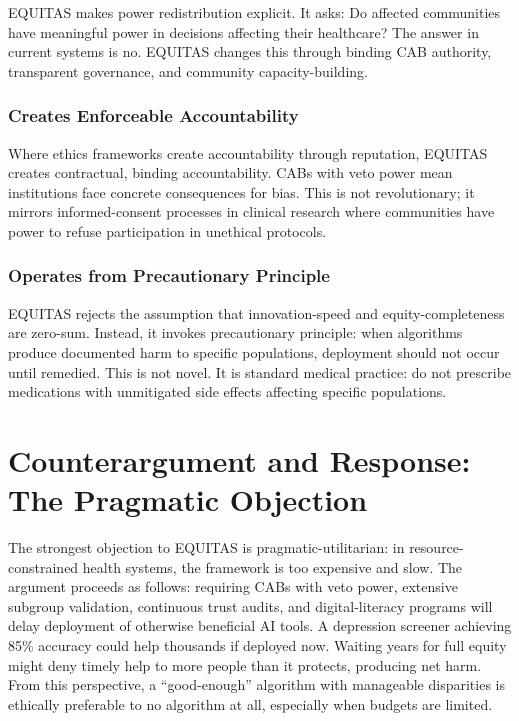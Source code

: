 \documentclass[12pt,a4paper]{article}
\begin{document}
EQUITAS makes power redistribution explicit. It asks: Do affected communities have meaningful power in decisions affecting their healthcare? The answer in current systems is no. EQUITAS changes this through binding CAB authority, transparent governance, and community capacity-building.

\subsubsection{Creates Enforceable Accountability}

Where ethics frameworks create accountability through reputation, EQUITAS creates contractual, binding accountability. CABs with veto power mean institutions face concrete consequences for bias. This is not revolutionary; it mirrors informed-consent processes in clinical research where communities have power to refuse participation in unethical protocols.

\subsubsection{Operates from Precautionary Principle}

EQUITAS rejects the assumption that innovation-speed and equity-completeness are zero-sum. Instead, it invokes precautionary principle: when algorithms produce documented harm to specific populations, deployment should not occur until remedied. This is not novel. It is standard medical practice: do not prescribe medications with unmitigated side effects affecting specific populations.

\section{Counterargument and Response: The Pragmatic Objection}

The strongest objection to EQUITAS is pragmatic-utilitarian: in resource-constrained health systems, the framework is too expensive and slow. The argument proceeds as follows: requiring CABs with veto power, extensive subgroup validation, continuous trust audits, and digital-literacy programs will delay deployment of otherwise beneficial AI tools. A depression screener achieving 85\% accuracy could help thousands if deployed now. Waiting years for full equity might deny timely help to more people than it protects, producing net harm. From this perspective, a ``good-enough'' algorithm with manageable disparities is ethically preferable to no algorithm at all, especially when budgets are limited.
\end{document}

